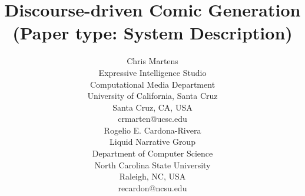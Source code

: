 \documentclass[letterpaper]{article}
\title{
        Discourse-driven Comic Generation
        \break
        {\small
	(Paper type: System Description)}
}
\author{
	Chris Martens\\
	Expressive Intelligence Studio\\
	Computational Media Department\\
	University of California, Santa Cruz\\
	Santa Cruz, CA, USA\\
	crmarten@ucsc.edu\\
	\And
	Rogelio E. Cardona-Rivera\\
	Liquid Narrative Group\\
	Department of Computer Science\\
	North Carolina State University\\
	Raleigh, NC, USA\\
	recardon@ncsu.edu\\
}
\begin{document}
 
\maketitle
\begin{abstract}
	\begin{quote}
	
	\end{quote}
\end{abstract}


















\end{document}
